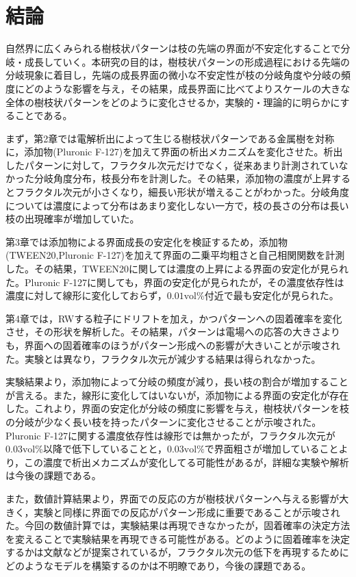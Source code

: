 \documentclass[autodetect-engine,dvi=dvipdfmx,a4paper,ja=standard,oneside,openany,11pt,draft]{bxjsbook}
\begin{document}
\chapter{結論}
自然界に広くみられる樹枝状パターンは枝の先端の界面が不安定化することで分岐・成長していく。本研究の目的は，樹枝状パターンの形成過程における先端の分岐現象に着目し，先端の成長界面の微小な不安定性が枝の分岐角度や分岐の頻度にどのような影響を与え，その結果，成長界面に比べてよりスケールの大きな全体の樹枝状パターンをどのように変化させるか，実験的・理論的に明らかにすることである。

まず，第2章では電解析出によって生じる樹枝状パターンである金属樹を対称に，添加物(Pluronic F-127)を加えて界面の析出メカニズムを変化させた。析出したパターンに対して，フラクタル次元だけでなく，従来あまり計測されていなかった分岐角度分布，枝長分布を計測した。その結果，添加物の濃度が上昇するとフラクタル次元が小さくなり，細長い形状が増えることがわかった。分岐角度については濃度によって分布はあまり変化しない一方で，枝の長さの分布は長い枝の出現確率が増加していた。

第3章では添加物による界面成長の安定化を検証するため，添加物(TWEEN20,Pluronic F-127)を加えて界面の二乗平均粗さと自己相関関数を計測した。その結果，TWEEN20に関しては濃度の上昇による界面の安定化が見られた。Pluronic F-127に関しても，界面の安定化が見られたが，その濃度依存性は濃度に対して線形に変化しておらず，$0.01 \mathrm{vol\%}$付近で最も安定化が見られた。

第4章では，RWする粒子にドリフトを加え，かつパターンへの固着確率を変化させ，その形状を解析した。その結果，パターンは電場への応答の大きさよりも，界面への固着確率のほうがパターン形成への影響が大きいことが示唆された。実験とは異なり，フラクタル次元が減少する結果は得られなかった。

実験結果より，添加物によって分岐の頻度が減り，長い枝の割合が増加することが言える。また，線形に変化してはいないが，添加物による界面の安定化が存在した。これより，界面の安定化が分岐の頻度に影響を与え，樹枝状パターンを枝の分岐が少なく長い枝を持ったパターンに変化させることが示唆された。Pluronic F-127に関する濃度依存性は線形では無かったが，フラクタル次元が$0.03 \mathrm{vol\%}$以降で低下していることと，$0.03 \mathrm{vol\%}$で界面粗さが増加していることより，この濃度で析出メカニズムが変化してる可能性があるが，詳細な実験や解析は今後の課題である。

また，数値計算結果より，界面での反応の方が樹枝状パターンへ与える影響が大きく，実験と同様に界面での反応がパターン形成に重要であることが示唆された。今回の数値計算では，実験結果は再現できなかったが，固着確率の決定方法を変えることで実験結果を再現できる可能性がある。どのように固着確率を決定するかは文献\cite{vicsek1984pattern}\cite{nittmann1986tip}などが提案されているが，フラクタル次元の低下を再現するためにどのようなモデルを構築するのかは不明瞭であり，今後の課題である。

\ifdraft{
  
  
}{}
\end{document}
